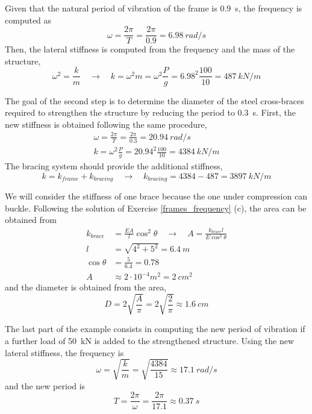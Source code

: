 \begin{Answer}[ref={frames_modification}]
Given that the natural period of vibration of the frame is \SI{0.9}{s}, the frequency is computed as
$$
\omega = \frac{2\pi}{T} = \frac{2\pi}{0.9} = \SI{6.98}{rad/s}
$$
Then, the lateral stiffness is computed from the frequency and the mass of the structure,
$$
\omega^2 = \frac{k}{m} \quad \rightarrow \quad
k = \omega^2m = \omega^2\frac{P}{g} = 6.98^2\frac{100}{10} = \SI{487}{kN/m}
$$

The goal of the second step is to determine the diameter of the steel cross-braces required to strengthen the structure by reducing the period to \SI{0.3}{s}. First, the new stiffness is obtained following the same procedure,
\begin{align*}
\omega = \frac{2\pi}{T} = \frac{2\pi}{0.3} = \SI{20.94}{rad/s} \\
k = \omega^2\frac{P}{g} = 20.94^2\frac{100}{10} = \SI{4384}{kN/m}
\end{align*}
The bracing system should provide the additional stiffness,
$$
k = k_{frame} + k_{bracing} \quad \rightarrow \quad k_{bracing} = 4384 - 487 = \SI{3897}{kN/m}
$$

We will consider the stiffness of one brace because the one under compression can buckle. 
Following the solution of Exercise \ref{frames_frequency} (c), the area can be obtained from
\begin{align*}
k_{brace} &= \frac{EA}{l}\cos^2\theta \quad \rightarrow \quad A = \frac{k_{brace}l}{E\cos^2\theta} \\
l &= \sqrt{4^2 + 5^2} = \SI{6.4}{m} \\
\cos\theta &= \frac{5}{6.4} = 0.78 \\
A &\approx 2\cdot 10^{-4} m^2 = \SI{2}{cm^2}
\end{align*}
and the diameter is obtained from the area,
$$
D = 2\sqrt{\frac{A}{\pi}} = 2\sqrt{\frac{2}{\pi}} \approx \SI{1.6}{cm}
$$

The last part of the example consists in computing the new period of vibration if a further load of \SI{50}{kN} is added to the strengthened structure. Using the new lateral stiffness, the frequency is
$$
\omega = \sqrt{\frac{k}{m}} = \sqrt{\frac{4384}{15}} \approx \SI{17.1}{rad/s}
$$
and the new period is
$$
T = \frac{2\pi}{\omega} = \frac{2\pi}{17.1} \approx \SI{0.37}{s}
$$

\end{Answer}

